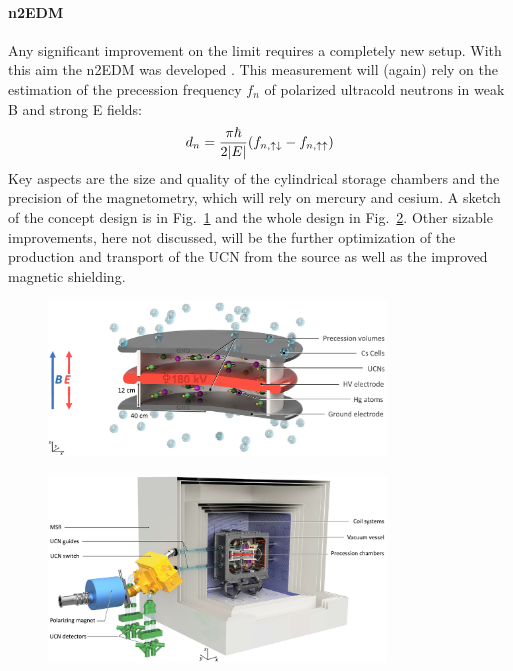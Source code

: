 \begin{refsection}
            \paragraph{n2EDM} Any significant improvement on the limit requires a completely new setup. With this aim the n2EDM was developed \cite{n2EDM}.
            This measurement will (again) rely on the estimation of the precession frequency $f_n$ of polarized ultracold neutrons in weak B and strong E fields:
            $$d_n = \frac{\pi\hbar}{2\abs{E}}(f_{n, \uparrow\downarrow}-f_{n, \uparrow\uparrow})$$
            Key aspects are the size and quality of the cylindrical storage chambers and the precision of the magnetometry, which will rely on mercury and cesium.
            A sketch of the concept design is in Fig.~\ref{fig:n2EDM} and the whole design in Fig.~\ref{fig:n2EDM_whole}.
            Other sizable improvements, here not discussed, will be the further optimization of the production and transport of the UCN from the source as well as the improved magnetic shielding.\\

            \begin{figure}
                \centering
                \includegraphics[width = 0.8\textwidth]{Figures/Introduction/n2EDM.png}
                \caption{}
                \label{fig:n2EDM}
            \end{figure}
            \begin{figure}
                \centering
                \includegraphics[width = 0.8\textwidth]{Figures/Introduction/n2EDM_whole.png}
                \caption{}
                \label{fig:n2EDM_whole}
            \end{figure}        
            

\end{refsection}
